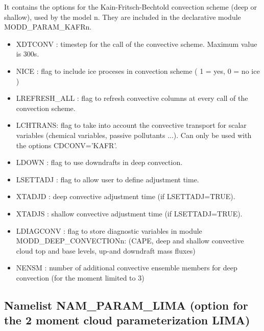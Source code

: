 It contains the options  for the Kain-Fritsch-Bechtold convection scheme (deep or shallow), used
by the  model n. They are included in the declarative module
MODD\_PARAM\_KAFRn.
\begin{itemize}
\item
{}
XDTCONV : timestep for the call of the convective scheme. Maximum value is 300s. 
\item
{}
NICE : flag to include ice proceses in convection scheme
( 1 = yes, 0 = no ice )
\item
{}
LREFRESH\_ALL : flag to refresh convective columns at every call of the
convection scheme.
\item
{}
LCHTRANS: flag to take into account the convective transport for
scalar variables (chemical variables, passive pollutants ...).
Can only be used with the options CDCONV='KAFR'.
\item
{}
LDOWN : flag to use downdrafts in deep convection.
\item
{}
LSETTADJ : flag to allow user to define adjustment time.
\item
{}
XTADJD : deep convective adjustment time (if LSETTADJ=TRUE).
\item
{}
XTADJS : shallow convective adjustment time (if LSETTADJ=TRUE).
\item
{}
LDIAGCONV : flag to store diagnostic variables in module MODD\_DEEP\_CONVECTIONn:
(CAPE, deep and shallow convective cloud top and base levels, up-and downdraft mass fluxes)
\item
{}
NENSM : number of additional convective ensemble members for deep convection
(for the moment limited to 3)
\end{itemize}
\subsection{Namelist NAM\_PARAM\_LIMA (option for the 2 moment cloud 
parameterization LIMA)}

